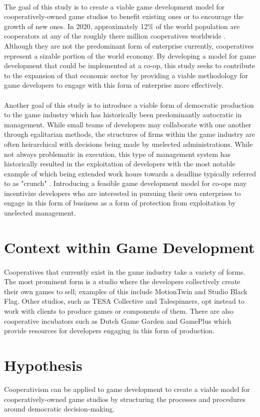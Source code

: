 \paragraph{} The goal of this study is to create a viable game development model for cooperatively-owned game studios to benefit existing ones or to encourage the growth of new ones. In 2020, approximately 12\% of the world population are cooperators at any of the roughly there million cooperatives worldwide \autocite{world_cooperative_monitor_exploring_2020}. Although they are not the predominant form of enterprise currently, cooperatives represent a sizable portion of the world economy. By developing a model for game development that could be implemented at a co-op, this study seeks to contribute to the expansion of that economic sector by providing a viable methodology for game developers to engage with this form of enterprise more effectively.

\paragraph{} Another goal of this study is to introduce a viable form of democratic production to the game industry which has historically been predominantly autocratic in management. While small teams of developers may collaborate with one another through egalitarian methods, the structures of firms within the game industry are often heirarchical with decisions being made by unelected administrations. While not always problematic in execution, this type of management system has historically resulted in the exploitation of developers with the most notable example of which being extended work hours towards a deadline typically referred to as "crunch" \autocite{woodcock_for_2020}. Introducing a feasible game development model for co-ops may incentivize developers who are interested in pursuing their own enterprises to engage in this form of business as a form of protection from exploitation by unelected management.

\section{Context within Game Development}

\paragraph{} Cooperatives that currently exist in the game industry take a variety of forms. The most prominent form is a studio where the developers collectively create their own games to sell; examples of this include MotionTwin and Studio Black Flag. Other studios, such as TESA Collective and Talespinners, opt instead to work with clients to produce games or components of them. There are also cooperative incubators such as Dutch Game Garden and GamePlus which provide resources for developers engaging in this form of production.

\section{Hypothesis}

Cooperativism can be applied to game development to create a viable model for cooperatively-owned game studios by structuring the processes and procedures around democratic decision-making.